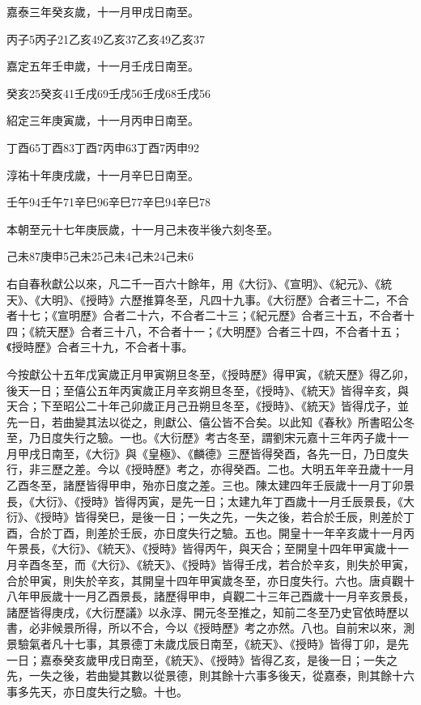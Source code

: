 \begin{pinyinscope}
 嘉泰三年癸亥歲，十一月甲戌日南至。



 丙子5丙子21乙亥49乙亥37乙亥49乙亥37



 嘉定五年壬申歲，十一月壬戌日南至。



 癸亥25癸亥41壬戌69壬戌56壬戌68壬戌56



 紹定三年庚寅歲，十一月丙申日南至。



 丁酉65丁酉83丁酉7丙申63丁酉7丙申92



 淳祐十年庚戌歲，十一月辛巳日南至。



 壬午94壬午71辛巳96辛巳77辛巳94辛巳78



 本朝至元十七年庚辰歲，十一月己未夜半後六刻冬至。



 己未87庚申5己未25己未4己未24己未6



 右自春秋獻公以來，凡二千一百六十餘年，用《大衍》、《宣明》、《紀元》、《統天》、《大明》、《授時》六歷推算冬至，凡四十九事。《大衍歷》合者三十二，不合者十七；《宣明歷》合者二十六，不合者二十三；《紀元歷》合者三十五，不合者十四；《統天歷》合者三十八，不合者十一；《大明歷》合者三十四，不合者十五；《授時歷》合者三十九，不合者十事。



 今按獻公十五年戊寅歲正月甲寅朔旦冬至，《授時歷》得甲寅，《統天歷》得乙卯，後天一日；至僖公五年丙寅歲正月辛亥朔旦冬至，《授時》、《統天》皆得辛亥，與天合；下至昭公二十年己卯歲正月己丑朔旦冬至，《授時》、《統天》皆得戊子，並先一日，若曲變其法以從之，則獻公、僖公皆不合矣。以此知《春秋》所書昭公冬至，乃日度失行之驗。一也。《大衍歷》考古冬至，謂劉宋元嘉十三年丙子歲十一月甲戌日南至，《大衍》與《皇極》、《麟德》三歷皆得癸酉，各先一日，乃日度失行，非三歷之差。今以《授時歷》考之，亦得癸酉。二也。大明五年辛丑歲十一月乙酉冬至，諸歷皆得甲申，殆亦日度之差。三也。陳太建四年壬辰歲十一月丁卯景長，《大衍》、《授時》皆得丙寅，是先一日；太建九年丁酉歲十一月壬辰景長，《大衍》、《授時》皆得癸巳，是後一日；一失之先，一失之後，若合於壬辰，則差於丁酉，合於丁酉，則差於壬辰，亦日度失行之驗。五也。開皇十一年辛亥歲十一月丙午景長，《大衍》、《統天》、《授時》皆得丙午，與天合；至開皇十四年甲寅歲十一月辛酉冬至，而《大衍》、《統天》、《授時》皆得壬戌，若合於辛亥，則失於甲寅，合於甲寅，則失於辛亥，其開皇十四年甲寅歲冬至，亦日度失行。六也。唐貞觀十八年甲辰歲十一月乙酉景長，諸歷得甲申，貞觀二十三年己酉歲十一月辛亥景長，諸歷皆得庚戌，《大衍歷議》以永淳、開元冬至推之，知前二冬至乃史官依時歷以書，必非候景所得，所以不合，今以《授時歷》考之亦然。八也。自前宋以來，測景驗氣者凡十七事，其景德丁未歲戊辰日南至，《統天》、《授時》皆得丁卯，是先一日；嘉泰癸亥歲甲戌日南至，《統天》、《授時》皆得乙亥，是後一日；一失之先，一失之後，若曲變其數以從景德，則其餘十六事多後天，從嘉泰，則其餘十六事多先天，亦日度失行之驗。十也。




\end{pinyinscope}
